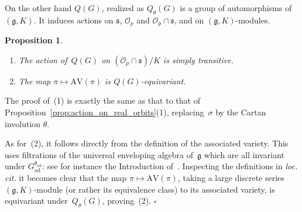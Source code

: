 \documentclass[10pt,leqno]{article}
\newtheorem{proposition}[equation]{Proposition}
\newcommand{\qed}{\hfill $\square$ \medskip}
\newcommand{\kernel}{\mathrm{kernel}}
\newcommand{\ad}{\mathrm{ad}}
\newcommand{\Gad}{G_\mathrm{ad}}
\newcommand{\Stab}{\mathrm{Stab}}
\renewcommand{\O}{\mathcal O}
\newcommand{\R}{\mathbb R}
\newcommand{\g}{\mathfrak g}
\newcommand{\s}{\mathfrak s}
\newcommand{\AV}{\mathrm{AV}}
\newcommand{\Op}{\O_p}
\begin{document}

On the other hand $Q(G)$, realized as $Q_\theta(G)$ is a group of automorphisms of $(\g,K)$.
It induces actions on $\s$, $\Op$ and $\Op\cap\s$, and on $(\g,K)$-modules.

\begin{proposition}\label{prop:action_on_K_orbits}
\begin{enumerate} 
\item The action of~$Q(G)$ on $(\Op \cap \s)/K$ is simply transitive.
\item The map $\pi \mapsto \AV(\pi)$ is $Q(G)$-equivariant.
\end{enumerate}
\end{proposition}

The proof of~(1) is exactly the same as that  to that of Proposition~\ref{prop:action_on_real_orbits}(1), replacing~$\sigma$ by the Cartan involution $\theta$.

As for~(2), it follows directly from the definition of the associated variety. This uses filtrations of the universal enveloping algebra of~$\g$ which are all invariant under $\Gad^{\theta_{\ad}}$: see for instance the Introduction of~\cite{vogan_bowdoin}. Inspecting the definitions in \emph{loc. cit.} it becomes clear that the map $\pi \mapsto \AV(\pi)$, taking a large discrete series $(\g,K)$-module  (or rather its equivalence class) to its associated variety, is equivariant under~$Q_{\theta}(G)$, proving~(2). 
\qed
\end{document}
